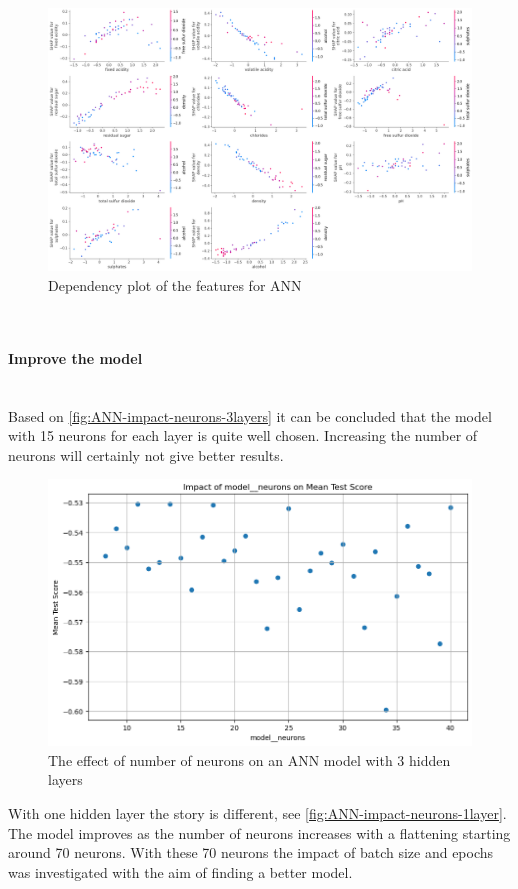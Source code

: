 \documentclass{article}
\newcommand{\subsubsubsection}[1]{%
  \paragraph{#1}\mbox{}\\}
\begin{document}
\begin{figure}
	\centering
	\includegraphics[width=\linewidth]{figures/shap_dependency_ann.png}
	\caption{Dependency plot of the features for ANN}
	\label{fig:dependency-plot-ann}
\end{figure}

\subsubsubsection{Improve the model}
Based on \autoref{fig:ANN-impact-neurons-3layers} it can be concluded that the model with 15 neurons for each layer is quite well chosen. Increasing the number of neurons will certainly not give better results.

\begin{figure}
	\centering
	\includegraphics[width=\linewidth]{figures/ANN_impact_neurons_3layers.png}
	\caption{The effect of number of neurons on an ANN model with 3 hidden layers}
	\label{fig:ANN-impact-neurons-3layers}
\end{figure}

With one hidden layer the story is different, see \autoref{fig:ANN-impact-neurons-1layer}.
The model improves as the number of neurons increases with a flattening starting around 70 neurons.
With these 70 neurons the impact of batch size and epochs was investigated with the aim of finding a better model.
\end{document}
